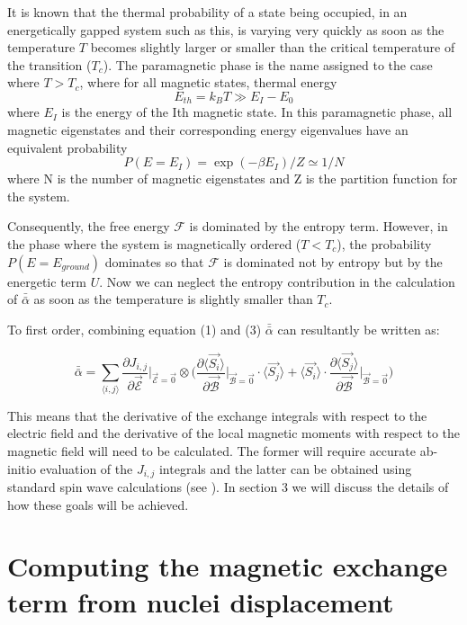 \documentclass[10pt]{article}
\begin{document}
It is known that the thermal probability of a state being occupied, in an energetically gapped system such as this, is varying very quickly as soon as the temperature $T$ becomes slightly larger or smaller than the critical temperature of the transition ($T_c$). The paramagnetic phase is the name assigned to the case where $T > T_c$, where for all magnetic states, thermal energy $$E_{th} = k_B T \gg E_I - E_0$$ where $E_I$ is the energy of the Ith magnetic state. In this paramagnetic phase, all magnetic eigenstates and their corresponding energy eigenvalues have an equivalent probability $$P(E = E_I) = \exp(-\beta E_I)/Z \simeq 1/N$$ where N is the number of magnetic eigenstates and Z is the partition function for the system. 

Consequently, the free energy $\mathcal{F}$ is dominated by the entropy term. However, in the phase where the system is magnetically ordered ($T < T_c$), the probability $P(E = E_{ground})$ dominates so that $\mathcal{F}$ is dominated not by entropy but by the energetic term $U$. Now we can neglect the entropy contribution in the calculation of $\bar{\bar{\alpha}}$ as soon as the temperature is slightly smaller than $T_c$.

To first order, combining equation (1) and (3) $\bar{\bar{\alpha}}$ can resultantly be written as:

\begin{equation}
	\bar{\bar{\alpha}} = \sum_{\langle i,j \rangle} \frac{\partial J_{i,j}}{\partial \vec{\mathcal{E}}}\biggr\vert_{\vec{\mathcal{E}}=\vec{0}}\otimes\biggr(\frac{\partial \langle \vec{S_i}\rangle}{\partial \vec{\mathcal{B}}}\biggr\vert_{\vec{\mathcal{B}} = \vec{0}}\cdot\langle\vec{S_j}\rangle + \langle\vec{S_i}\rangle\cdot\frac{\partial \langle \vec{S_j}\rangle}{\partial\vec{\mathcal{B}}}\biggr\vert_{\vec{\mathcal{B}}=\vec{0}}\biggr)
\end{equation}

This means that the derivative of the exchange integrals with respect to the electric field and the derivative of the local magnetic moments with respect to the magnetic field will need to be calculated. The former will require accurate ab-initio evaluation of the $J_{i,j}$ integrals and the latter can be obtained using standard spin wave calculations (see \cite{anderson1951limits,kubo1952spin,oguchi1960theory}). In section 3 we will discuss the details of how these goals will be achieved.

\section{Computing the magnetic exchange term from nuclei displacement}
\end{document}
